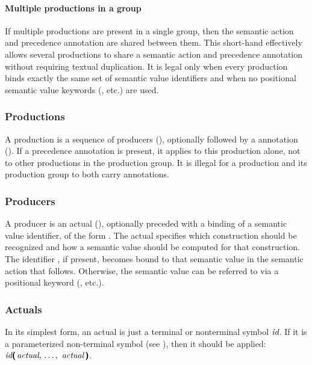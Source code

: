 \documentclass[onecolumn,11pt,nocopyrightspace,preprint]{sigplanconf}
\begin{document}
\paragraph{Multiple productions in a group}

If multiple productions are present in a single group, then the semantic
action and precedence annotation are shared between them. This short-hand
effectively allows several productions to share a semantic action and
precedence annotation without requiring textual duplication. It is legal only
when every production binds exactly the same set of semantic value identifiers
and when no positional semantic value keywords (, etc.) are used.

\subsubsection{Productions}
\label{sec:productions}

A production is a sequence of producers (), optionally
followed by a \dprec annotation (). If a precedence annotation
is present, it applies to this production alone, not to other productions in
the production group. It is illegal for a production and its production group
to both carry \dprec annotations.

\subsubsection{Producers}
\label{sec:producers}

A producer is an actual (), optionally preceded with a
binding of a semantic value identifier, of the form  \dequal. The
actual specifies which construction should be recognized and how a semantic
value should be computed for that construction. The identifier , if
present, becomes bound to that semantic value in the semantic action that
follows. Otherwise, the semantic value can be referred to via a positional
keyword (, etc.).

\subsubsection{Actuals}
\label{sec:actual}

In its simplest form, an actual is just a terminal or nonterminal symbol
$\textit{id}$. If it is a parameterized non-terminal symbol (see
), then it should be applied:
$\nt{id}\tuple{\nt{actual}}$.
\end{document}
